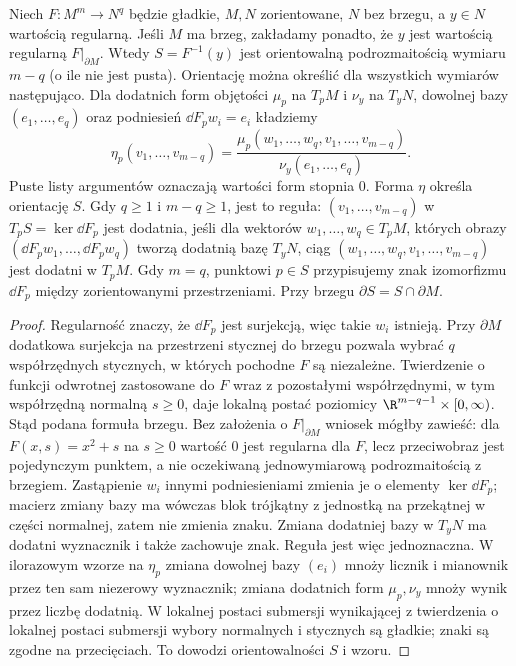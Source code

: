 \begin{twierdzenie}
\label{thm:orientacja-poziomicy}
Niech $F:M^m\to N^q$ będzie gładkie,
$M,N$ zorientowane, $N$ bez brzegu, a $y\in N$ wartością
regularną. Jeśli $M$ ma brzeg, zakładamy ponadto, że $y$
jest wartością regularną $F|_{\partial M}$.
Wtedy $S=F^{-1}(y)$ jest orientowalną podrozmaitością
wymiaru $m-q$ (o ile nie jest pusta). Orientację
można określić dla wszystkich wymiarów następująco.
Dla dodatnich form objętości $\mu_p$ na $T_pM$
i $\nu_y$ na $T_yN$, dowolnej bazy $(e_1,\ldots,e_q)$
oraz podniesień $\dd F_pw_i=e_i$ kładziemy
\[
 \eta_p(v_1,\ldots,v_{m-q})
 =\frac{\mu_p(w_1,\ldots,w_q,v_1,\ldots,v_{m-q})}
        {\nu_y(e_1,\ldots,e_q)}.
\]
Puste listy argumentów oznaczają wartości form stopnia $0$.
Forma $\eta$ określa orientację $S$. Gdy $q\geq1$
i $m-q\geq1$, jest to reguła: $(v_1,\ldots,v_{m-q})$
w $T_pS=\ker\dd F_p$ jest dodatnia, jeśli dla
wektorów $w_1,\ldots,w_q\in T_pM$, których obrazy
$(\dd F_pw_1,\ldots,\dd F_pw_q)$ tworzą dodatnią
bazę $T_yN$, ciąg
$(w_1,\ldots,w_q,v_1,\ldots,v_{m-q})$
jest dodatni w $T_pM$. Gdy $m=q$, punktowi $p\in S$
przypisujemy znak izomorfizmu $\dd F_p$ między
zorientowanymi przestrzeniami. Przy brzegu
$\partial S=S\cap\partial M$.
\end{twierdzenie}
\begin{proof}
Regularność znaczy, że $\dd F_p$ jest surjekcją,
więc takie $w_i$ istnieją. Przy $\partial M$ dodatkowa
surjekcja na przestrzeni stycznej do brzegu pozwala wybrać
$q$ współrzędnych stycznych, w których pochodne $F$ są
niezależne. Twierdzenie o funkcji odwrotnej zastosowane
do $F$ wraz z pozostałymi współrzędnymi, w tym współrzędną
normalną $s\geq0$, daje lokalną postać poziomicy
$\R^{m-q-1}\times[0,\infty)$. Stąd podana formuła brzegu.
Bez założenia o $F|_{\partial M}$ wniosek mógłby zawieść:
dla $F(x,s)=x^2+s$ na $s\geq0$ wartość $0$ jest regularna
dla $F$, lecz przeciwobraz jest pojedynczym punktem,
a nie oczekiwaną jednowymiarową podrozmaitością z brzegiem. Zastąpienie $w_i$
innymi podniesieniami zmienia je o elementy
$\ker\dd F_p$; macierz zmiany bazy ma wówczas
blok trójkątny z jednostką na przekątnej w części
normalnej, zatem nie zmienia znaku. Zmiana
dodatniej bazy w $T_yN$ ma dodatni wyznacznik
i także zachowuje znak. Reguła jest więc
jednoznaczna. W ilorazowym wzorze na $\eta_p$ zmiana
dowolnej bazy $(e_i)$ mnoży licznik i mianownik przez
ten sam niezerowy wyznacznik; zmiana dodatnich form
$\mu_p,\nu_y$ mnoży wynik przez liczbę dodatnią.
W lokalnej postaci submersji wynikającej z twierdzenia o lokalnej postaci submersji wybory normalnych
i stycznych są gładkie; znaki są zgodne na przecięciach.
To dowodzi orientowalności $S$ i wzoru.
\end{proof}

